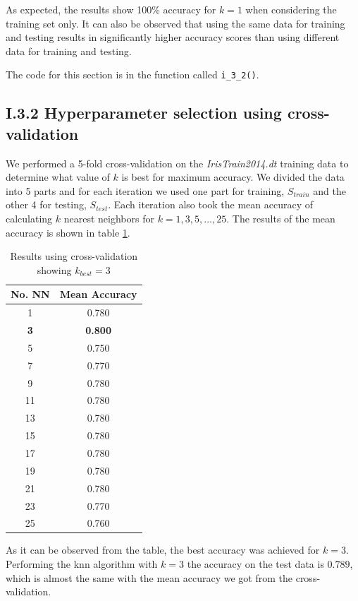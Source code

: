 \documentclass[12pt]{article}
\begin{document}
  As expected, the results show 100\% accuracy for $k = 1$ when considering the training set only. It can also be observed that using the same data for training and testing results in significantly higher accuracy scores than using different data for training and testing. 

  The code for this section is in the function called \texttt{i\_3\_2()}.

\subsection*{I.3.2 Hyperparameter selection using cross-validation}

  We performed a 5-fold cross-validation on the \textit{IrisTrain2014.dt} training data to determine what value of $k$ is best for maximum accuracy. We divided the data into 5 parts and for each iteration we used one part for training, $S_{train}$ and the other 4 for testing, $S_{test}$. Each iteration also took the mean accuracy of calculating $k$ nearest neighbors for $k = 1, 3, 5, \dots, 25$. The results of the mean accuracy is shown in table \ref{table:mean_accuracy_cross_fold}.

  \begin{table}[h]
    \centering
    \begin{tabular}{| c | c |}
      \hline
        No. NN & Mean Accuracy \\
      \hline
        1 & 0.780 \\
        \textbf{3} & \textbf{0.800} \\
        5 & 0.750 \\
        7 & 0.770 \\
        9 & 0.780 \\
        11 & 0.780 \\
        13 & 0.780 \\
        15 & 0.780 \\
        17 & 0.780 \\
        19 & 0.780 \\
        21 & 0.780 \\
        23 & 0.770 \\
        25 & 0.760 \\
      \hline
    \end{tabular}
    \caption{Results using cross-validation showing $k_{best} = 3$}
    \label{table:mean_accuracy_cross_fold}
  \end{table}

  As it can be observed from the table, the best accuracy was achieved for $k = 3$. Performing the knn algorithm with $k = 3$ the accuracy on the test data is $0.789$, which is almost the same with the mean accuracy we got from the cross-validation.
\end{document}
